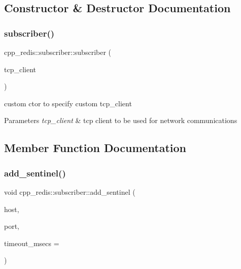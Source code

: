 \subsection{Constructor \& Destructor Documentation}
\mbox{\label{classcpp__redis_1_1subscriber_a66136601f44564842e2c67de2da199af}} 
\subsubsection{\texorpdfstring{subscriber()}{subscriber()}}
{\footnotesize\ttfamily cpp\+\_\+redis\+::subscriber\+::subscriber (\begin{DoxyParamCaption}\item[{const std\+::shared\+\_\+ptr$<$ \hyperlink{classcpp__redis_1_1network_1_1tcp__client__iface}{network\+::tcp\+\_\+client\+\_\+iface} $>$ \&}]{tcp\+\_\+client }\end{DoxyParamCaption})\hspace{0.3cm}{\ttfamily [explicit]}}

custom ctor to specify custom tcp\+\_\+client


\begin{DoxyParams}{Parameters}
{\em tcp\+\_\+client} & tcp client to be used for network communications \\
\hline
\end{DoxyParams}


\subsection{Member Function Documentation}
\mbox{\label{classcpp__redis_1_1subscriber_a2faf9e9cc9c95e3c0fed148355af84f1}} 
\subsubsection{\texorpdfstring{add\+\_\+sentinel()}{add\_sentinel()}}
{\footnotesize\ttfamily void cpp\+\_\+redis\+::subscriber\+::add\+\_\+sentinel (\begin{DoxyParamCaption}\item[{const std\+::string \&}]{host,  }\item[{std\+::size\+\_\+t}]{port,  }\item[{std\+::uint32\+\_\+t}]{timeout\+\_\+msecs = {} }\end{DoxyParamCaption})}

